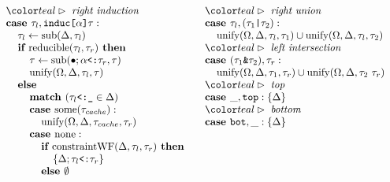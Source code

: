 \documentclass[acmsmall]{acmart}
\begin{document}
\begin{figure*}[h]
\[\begin{array}[t]{@{} l}
    \I \C{right induction}
    \\
    \I \B{case } \tau_l, \code{induc[$\alpha$]$\tau$} :
    \\
    \I\I \tau_l \leftarrow \F{sub}(\Delta, \tau_l)
    \\
    \I\I \B{if } \F{reducible}(\tau_l, \tau_r) \B{ then }
    \\
    \I\I\I \tau \leftarrow \F{sub}(\bullet;\code{$\alpha$<:$\tau_r$}, \tau) 
    \\
    \I\I\I \F{unify}(\Omega, \Delta, \tau_l, \tau)
    \\
    \I\I \B{else }
    \\
    \I\I\I \B{match } (\code{$\tau_l$<:\_} \in \Delta)
    \\
    \I\I\I \B{case } \F{some}(\tau_{cache}) :
    \\
    \I\I\I\I \F{unify}(\Omega, \Delta, \tau_{cache}, \tau_r)
    \\
    \I\I\I \B{case } \F{none} :
    \\
    \I\I\I\I \B{if } \F{constraintWF}(\Delta, \tau_l, \tau_r) \B{ then }
    \\
    \I\I\I\I\I \{\Delta;\code{$\tau_l$<:$\tau_r$}\}
    \\
    \I\I\I\I \B{else } \emptyset 
\end{array}
\begin{array}[t]{@{} l}
    \I \C{right union}
    \\
    \I \B{case } \tau_l, (\code{$\tau_1$|$\tau_2$}) : 
    \\
    \I\I \F{unify}(\Omega, \Delta, \tau_l, \tau_1) \cup \F{unify}(\Omega, \Delta, \tau_l, \tau_2) 

    \\

    \I \C{left intersection}
    \\
    \I \B{case } (\code{$\tau_1$\&$\tau_2$}), \tau_r : 
    \\
    \I\I \F{unify}(\Omega, \Delta, \tau_1, \tau_r) \cup \F{unify}(\Omega, \Delta, \tau_2\ \tau_r) 

    \\

    \I \C{top}
    \\
    \I \B{case } \_, \code{top} : \{\Delta\}

    \\

    \I \C{bottom}
    \\
    \I \B{case } \code{bot}, \_ : \{\Delta\}


\end{array}\]
\end{figure*}
\end{document}
